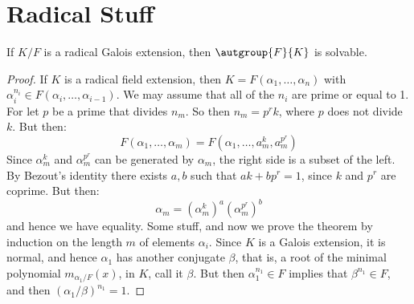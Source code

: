 \section{Radical Stuff}
    \begin{theorem}
        If $K/F$ is a radical Galois extension, then $\autgroup{F}{K}$
        is solvable.
    \end{theorem}
    \begin{proof}
        If $K$ is a radical field extension, then
        $K=F(\alpha_{1},\dots,\alpha_{n})$ with
        $\alpha_{i}^{n_{i}}\in{F}(\alpha_{i},\dots,\alpha_{i-1})$. We may
        assume that all of the $n_{i}$ are prime or equal to 1. For let
        $p$ be a prime that divides $n_{m}$. So then
        $n_{m}=p^{r}k$, where $p$ does not divide $k$. But then:
        \begin{equation}
            F(\alpha_{1},\dots,\alpha_{m})
                =F(\alpha_{1},\dots,a_{m}^{k},a_{m}^{p^{r}})
        \end{equation}
        Since $\alpha_{m}^{k}$ and $\alpha_{m}^{p^{r}}$ can be generated
        by $\alpha_{m}$, the right side is a subset of the left. By Bezout's
        identity there exists $a,b$ such that $ak+bp^{r}=1$, since
        $k$ and $p^{r}$ are coprime. But then:
        \begin{equation}
            \alpha_{m}=(\alpha_{m}^{k})^{a}(\alpha_{m}^{p^{r}})^{b}
        \end{equation}
        and hence we have equality. Some stuff, and now we prove the theorem
        by induction on the length $m$ of elements $\alpha_{i}$. Since $K$
        is a Galois extension, it is normal, and hence $\alpha_{1}$ has
        another conjugate $\beta$, that is, a root of the minimal polynomial
        $m_{\alpha_{1}/F}(x)$, in $K$, call it $\beta$. But then
        $\alpha_{1}^{n_{1}}\in{F}$ implies that $\beta^{n_{1}}\in{F}$, and
        then $(\alpha_{1}/\beta)^{n_{1}}=1$.
    \end{proof}
